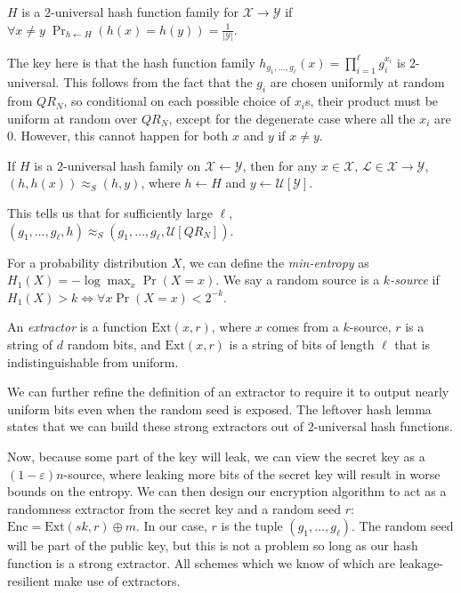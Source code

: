 \documentclass[10pt]{article}
\newcommand{\unif}[1]{\mathcal{U}\left[{#1}\right]}
\begin{document}
\begin{definition}
$H$ is a 2-universal hash function family for $\mathcal{X} \rightarrow \mathcal{Y}$ if $\forall x \neq y \; \Pr_{h \leftarrow H}(h(x) = h(y)) = \frac{1}{|\mathcal{Y}|}$.
\end{definition}

The key here is that the hash function family $h_{g_1,\dots,g_\ell}(x) = \prod_{i=1}^\ell g_i ^ {x_i}$ is 2-universal. This follows from the fact that the $g_i$ are chosen uniformly at random from $QR_N$, so conditional on each possible choice of $x_i$s, their product must be uniform at random over $QR_N$, except for the degenerate case where all the $x_i$ are $0$. However, this cannot happen for both $x$ and $y$ if $x \neq y$.

\begin{lemma}
If $H$ is a 2-universal hash family on $\mathcal{X} \leftarrow \mathcal{Y}$, then for any $x \in \mathcal{X}$, $\mathcal{L} \in \mathcal{X} \rightarrow \mathcal{Y}$, $(h,h(x)) \approx_S (h,y)$, where $h \leftarrow H$ and $y \leftarrow \unif{\mathcal{Y}}$.
\end{lemma}

This tells us that for sufficiently large $\ell$, $(g_1,\dots,g_\ell,h) \approx_S (g_1,\dots,g_\ell,\unif{QR_N})$.

\begin{definition}
For a probability distribution $X$, we can define the \emph{min-entropy} as $H_1(X) = -\log \max_x \Pr(X = x)$. We say a random source is a \emph{$k$-source} if $H_1(X) > k \iff \forall x \Pr(X = x) < 2^{-k}$.
\end{definition}

\begin{definition}
An \emph{extractor} is a function $\mathrm{Ext}(x,r)$, where $x$ comes from a $k$-source, $r$ is a string of $d$ random bits, and $\mathrm{Ext}(x,r)$ is a string of bits of length $\ell$ that is indistinguishable from uniform.
\end{definition}

We can further refine the definition of an extractor to require it to output nearly uniform bits even when the random seed is exposed. The leftover hash lemma states that we can build these strong extractors out of 2-universal hash functions.

Now, because some part of the key will leak, we can view the secret key as a $(1-\varepsilon)n$-source, where leaking more bits of the secret key will result in worse bounds on the entropy. We can then design our encryption algorithm to act as a randomness extractor from the secret key and a random seed $r$: $\mathrm{Enc} = \mathrm{Ext}(sk,r) \oplus m$. In our case, $r$ is the tuple $(g_1,\dots,g_\ell)$. The random seed will be part of the public key, but this is not a problem so long as our hash
function is a strong extractor. All schemes which we know of which are leakage-resilient make
use of extractors.
\end{document}
